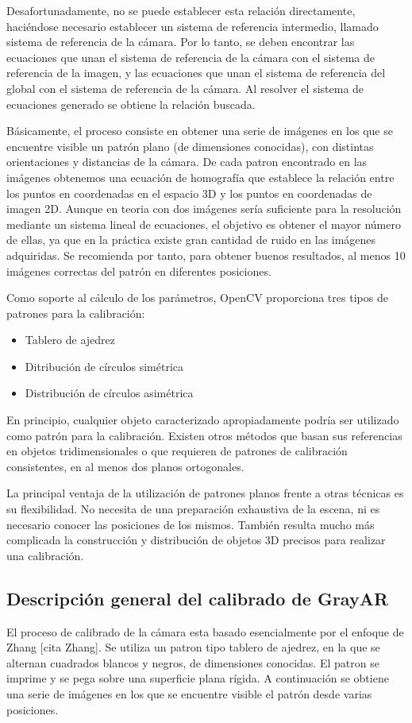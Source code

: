 Desafortunadamente, no se puede establecer esta relación directamente, haciéndose necesario establecer un sistema de referencia intermedio, llamado sistema de referencia de la cámara. Por lo tanto, se deben encontrar las ecuaciones que unan el sistema de referencia de la cámara con el sistema de referencia de la imagen, y las ecuaciones que unan el sistema  de referencia del global con el sistema de referencia de la cámara. Al resolver el sistema de ecuaciones generado se obtiene la relación buscada.

Básicamente, el proceso consiste en obtener una serie de imágenes en los que se encuentre visible un patrón plano (de dimensiones conocidas), con distintas orientaciones y distancias de la cámara. De cada patron encontrado en las imágenes obtenemos una ecuación de homografía que establece la relación entre los puntos en coordenadas en el espacio 3D y los puntos en coordenadas de imagen 2D. Aunque en teoria con dos imágenes sería suficiente para la resolución mediante un sistema lineal de ecuaciones, el objetivo es obtener el mayor número de ellas, ya que en la práctica existe gran cantidad de ruido en las imágenes adquiridas. Se recomienda por tanto, para obtener buenos resultados, al menos 10 imágenes correctas del patrón en diferentes posiciones.

Como soporte al cálculo de los parámetros, OpenCV proporciona tres tipos de patrones para la calibración:

\begin{itemize}
\item Tablero de ajedrez
\item Ditribución de círculos simétrica
\item Distribución de círculos asimétrica 
\end{itemize}

En principio, cualquier objeto caracterizado apropiadamente podría ser utilizado como patrón para la calibración. Existen otros métodos que basan sus referencias en objetos tridimensionales o que requieren de patrones de calibración consistentes, en al menos dos planos ortogonales. 

La principal ventaja de la utilización de patrones planos frente a otras técnicas es su flexibilidad. No necesita de una preparación exhaustiva de la escena, ni es necesario conocer las posiciones de los mismos. También resulta mucho más complicada la construcción y distribución de objetos 3D precisos para realizar una calibración.

\subsection{Descripción general del calibrado de GrayAR}
El proceso de calibrado de la cámara esta basado esencialmente por el enfoque de Zhang [cita Zhang]. Se utiliza un patron tipo tablero de ajedrez, en la que se alternan cuadrados blancos y negros, de dimensiones conocidas. El patron se imprime y se pega sobre una superficie plana rígida. A continuación se obtiene una serie de imágenes en los que se encuentre visible el patrón desde varias posiciones. 

